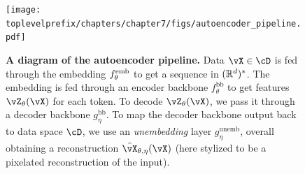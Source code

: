 \documentclass[../../book-main.tex]{subfiles}
\begin{document}
\begin{figure}
    \texttt{[image: \\toplevelprefix/chapters/chapter7/figs/autoencoder\_pipeline.pdf]}
    \caption{\small\textbf{A diagram of the autoencoder pipeline.} Data \(\vX \in \cD\) is fed through the embedding \(f_{\theta}^{\mathrm{emb}}\) to get a sequence in \((\mathbb{R}^{d})^{*}\). The embedding is fed through an encoder backbone \(f_{\theta}^{\mathrm{bb}}\) to get features \(\vZ_{\theta}(\vX)\) for each token. To decode \(\vZ_{\theta}(\vX)\), we pass it through a decoder backbone \(g_{\eta}^{\mathrm{bb}}\). To map the decoder backbone output back to data space \(\cD\), we use an \textit{unembedding} layer \(g_{\eta}^{\mathrm{unemb}}\), overall obtaining a reconstruction \(\hat{\vX}_{\theta, \eta}(\vX)\) (here stylized to be a pixelated reconstruction of the input).}
    \label{fig:overall_autoencoder_pipeline}
\end{figure}
\end{document}

